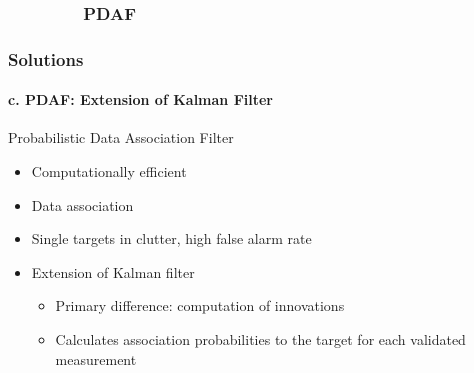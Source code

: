 \subsubsection{\ \ \ \ \ \ \ \ PDAF }
\begin{frame}
\frametitle{Solutions}
\framesubtitle{c. PDAF: Extension of Kalman Filter}
\mypagenum
{\color{red} Probabilistic Data Association Filter}
\begin{itemize}
\item Computationally efficient 
\item Data association
\item Single targets in clutter, high false alarm rate
\item Extension of Kalman filter
\begin{itemize}
\item Primary difference: computation of innovations
\item Calculates association probabilities to the target for each validated measurement
\end{itemize}
\end{itemize}
\end{frame}








